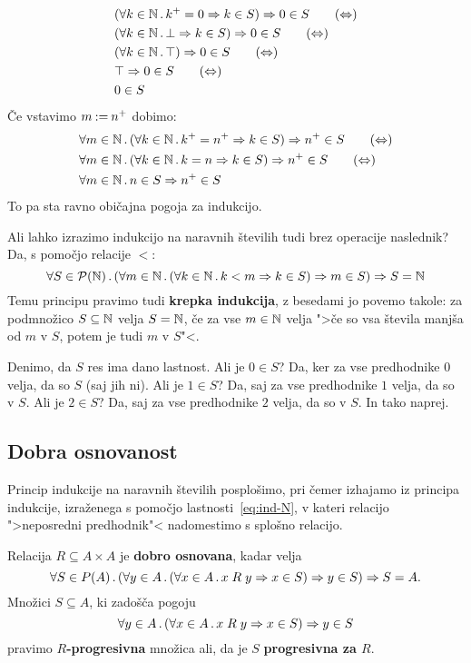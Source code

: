 %
\begin{align}
  &(\all{k \in \NN} \suc{k} = 0 \lthen k \in S) \lthen 0 \in S \tag{$\liff$} \\
  &(\all{k \in \NN} \bot \lthen k \in S) \lthen 0 \in S \tag{$\liff$} \\
  &(\all{k \in \NN} \top) \lthen 0 \in S \tag{$\liff$} \\
  &\top \lthen 0 \in S \tag{$\liff$} \\
  &0 \in S \notag
\end{align}
%
Če vstavimo $m \mathbin{{:}{=}} {n^{+}}$ dobimo:
%
\begin{align}
  &\all{m \in \NN} (\all{k \in \NN} \suc{k} = \suc{n} \lthen k \in S) \lthen \suc{n} \in S \tag{$\liff$} \\
  &\all{m \in \NN} (\all{k \in \NN} k = n \lthen k \in S) \lthen \suc{n} \in S \tag{$\liff$} \\
  &\all{m \in \NN} n \in S \lthen \suc{n} \in S \notag
\end{align}
%
To pa sta ravno običajna pogoja za indukcijo.

Ali lahko izrazimo indukcijo na naravnih številih tudi brez operacije naslednik?
Da, s pomočjo relacije $<$:
%
\begin{equation*}
    \forall S \in \mathcal{P}(\mathbb{N}) \,.\, (\forall m \in \mathbb{N} \,.\, (\forall k \in \mathbb{N} \,.\, k < m \Rightarrow k \in S) \Rightarrow m \in S) \Rightarrow S = \mathbb{N}
\end{equation*}
%
Temu principu pravimo tudi \textbf{krepka indukcija}, z besedami jo povemo takole: za podmnožico $S \subseteq \mathbb{N}$ velja
$S = \mathbb{N}$, če za vse $m \in \mathbb{N}$ velja ">če so vsa števila manjša od $m$ v $S$, potem je tudi $m$ v $S$"<.

Denimo, da $S$ res ima dano lastnost. Ali je $0 \in S$? Da, ker za vse predhodnike $0$ velja, da
so $S$ (saj jih ni). Ali je $1 \in S$? Da, saj za vse predhodnike $1$ velja, da so v $S$. Ali je $2 \in
S$? Da, saj za vse predhodnike $2$ velja, da so v $S$. In tako naprej.


\subsection{Dobra osnovanost}

Princip indukcije na naravnih številih posplošimo, pri čemer izhajamo iz principa indukcije, izraženega s pomočjo lastnosti~\eqref{eq:ind-N}, v kateri relacijo ">neposredni predhodnik"< nadomestimo s splošno relacijo.

\begin{definicija}
  Relacija $R \subseteq A \times A$ je \textbf{dobro osnovana}, kadar velja
  \begin{equation}
    \label{eq:ind-wf}%
    \all{S \in P(A)} (\all{y \in A} (\all{x \in A} x \rel{R} y \lthen x \in S) \lthen y \in S) \lthen S = A.
  \end{equation}
  Množici $S \subseteq A$, ki zadošča pogoju
  \begin{equation*}
  \forall y \in A \,.\, (\forall x \in A \,.\, x \mathrel{R} y \Rightarrow x \in S) \Rightarrow y \in S
  \end{equation*}
  pravimo \textbf{$R$-progresivna} množica ali, da je $S$ \textbf{progresivna za $R$}.
\end{definicija}


